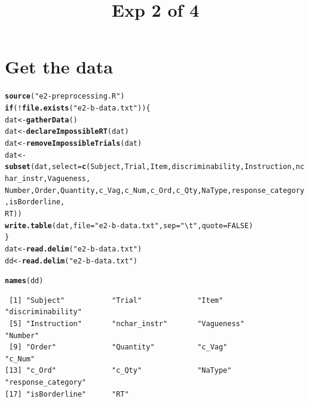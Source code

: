 \documentclass[a4paper,12pt,twoside]{article}\usepackage[]{graphicx}\usepackage[]{color}
\title{Exp 2 of 4}
\makeatletter
\newcommand{\hlnum}[1]{\textcolor[rgb]{0.686,0.059,0.569}{#1}}%
\newcommand{\hlstr}[1]{\textcolor[rgb]{0.192,0.494,0.8}{#1}}%
\newcommand{\hlopt}[1]{\textcolor[rgb]{0,0,0}{#1}}%
\newcommand{\hlstd}[1]{\textcolor[rgb]{0.345,0.345,0.345}{#1}}%
\newcommand{\hlkwa}[1]{\textcolor[rgb]{0.161,0.373,0.58}{\textbf{#1}}}%
\newcommand{\hlkwb}[1]{\textcolor[rgb]{0.69,0.353,0.396}{#1}}%
\newcommand{\hlkwc}[1]{\textcolor[rgb]{0.333,0.667,0.333}{#1}}%
\newcommand{\hlkwd}[1]{\textcolor[rgb]{0.737,0.353,0.396}{\textbf{#1}}}%
\newenvironment{kframe}{%
 \def\at@end@of@kframe{}%
 \ifinner\ifhmode%
  \def\at@end@of@kframe{\end{minipage}}%
  \begin{minipage}{\columnwidth}%
 \fi\fi%
 \def\FrameCommand##1{\hskip\@totalleftmargin \hskip-\fboxsep
 \colorbox{shadecolor}{##1}\hskip-\fboxsep
     \hskip-\linewidth \hskip-\@totalleftmargin \hskip\columnwidth}%
 \MakeFramed {\advance\hsize-\width
   \@totalleftmargin\z@ \linewidth\hsize
   \@setminipage}}%
 {\par\unskip\endMakeFramed%
 \at@end@of@kframe}
\newenvironment{knitrout}{}{} %
\makeatother
\begin{document}
\maketitle
\tableofcontents
\clearpage





\section{Get the data}

\begin{knitrout}\scriptsize
{}\color{fgcolor}\begin{kframe}
\begin{alltt}
\hlkwd{source}\hlstd{(}\hlstr{"e2-preprocessing.R"}\hlstd{)}
\hlkwa{if} \hlstd{(}\hlopt{!}\hlkwd{file.exists}\hlstd{(}\hlstr{"e2-b-data.txt"}\hlstd{)) \{}
    \hlstd{dat} \hlkwb{<-} \hlkwd{gatherData}\hlstd{()}
    \hlstd{dat} \hlkwb{<-} \hlkwd{declareImpossibleRT}\hlstd{(dat)}
    \hlstd{dat} \hlkwb{<-} \hlkwd{removeImpossibleTrials}\hlstd{(dat)}
    \hlstd{dat} \hlkwb{<-} \hlkwd{subset}\hlstd{(dat,} \hlkwc{select} \hlstd{=} \hlkwd{c}\hlstd{(Subject, Trial, Item, discriminability, Instruction, nchar_instr, Vagueness,}
        \hlstd{Number, Order, Quantity, c_Vag, c_Num, c_Ord, c_Qty, NaType, response_category, isBorderline,}
        \hlstd{RT))}
    \hlkwd{write.table}\hlstd{(dat,} \hlkwc{file} \hlstd{=} \hlstr{"e2-b-data.txt"}\hlstd{,} \hlkwc{sep} \hlstd{=} \hlstr{"\textbackslash{}t"}\hlstd{,} \hlkwc{quote} \hlstd{=} \hlnum{FALSE}\hlstd{)}
\hlstd{\}}
\hlstd{dat} \hlkwb{<-} \hlkwd{read.delim}\hlstd{(}\hlstr{"e2-b-data.txt"}\hlstd{)}
\hlstd{dd} \hlkwb{<-} \hlkwd{read.delim}\hlstd{(}\hlstr{"e2-b-data.txt"}\hlstd{)}
\end{alltt}
\end{kframe}
\end{knitrout}

\clearpage

\begin{knitrout}\scriptsize
{}\color{fgcolor}\begin{kframe}
\begin{alltt}
\hlkwd{names}\hlstd{(dd)}
\end{alltt}
\begin{verbatim}
 [1] "Subject"           "Trial"             "Item"              "discriminability" 
 [5] "Instruction"       "nchar_instr"       "Vagueness"         "Number"           
 [9] "Order"             "Quantity"          "c_Vag"             "c_Num"            
[13] "c_Ord"             "c_Qty"             "NaType"            "response_category"
[17] "isBorderline"      "RT"               
\end{verbatim}
\end{kframe}
\end{knitrout}
\end{document}
